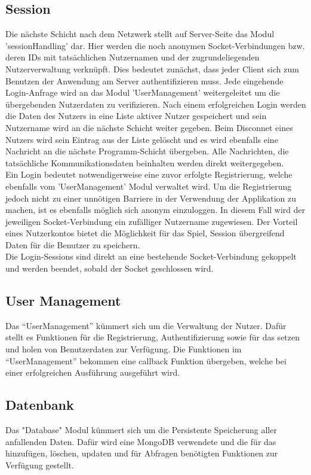 \documentclass[a4paper]{spie}  %
\begin{document}
\subsection{Session}
Die nächste Schicht nach dem Netzwerk stellt auf Server-Seite das Modul 'sessionHandling' dar. Hier werden die noch anonymen Socket-Verbindungen bzw. deren IDs mit tatsächlichen Nutzernamen und der zugrundeliegenden Nutzerverwaltung verknüpft. Dies bedeutet zunächst, dass jeder Client sich zum Benutzen der Anwendung am Server authentifizieren muss. Jede eingehende Login-Anfrage wird an das Modul 'UserManagement' weitergeleitet um die übergebenden Nutzerdaten zu verifizieren. Nach einem erfolgreichen Login werden die Daten des Nutzers in eine Liste aktiver Nutzer gespeichert und sein Nutzername wird an die nächste Schicht weiter gegeben. Beim Disconnet eines Nutzers wird sein Eintrag aus der Liste gelöscht und es wird ebenfalls eine Nachricht an die nächste Programm-Schicht übergeben. Alle Nachrichten, die tatsächliche Kommunikationsdaten beinhalten werden direkt weitergegeben.\\
Ein Login bedeutet notwendigerweise eine zuvor erfolgte Registrierung, welche ebenfalls vom 'UserManagement' Modul verwaltet wird. Um die Registrierung jedoch nicht zu einer unnötigen Barriere in der Verwendung der Applikation zu machen, ist es ebenfalls möglich sich anonym einzuloggen. In diesem Fall wird der jeweiligen Socket-Verbindung ein zufälliger Nutzername zugewiesen. Der Vorteil eines Nutzerkontos bietet die Möglichkeit für das Spiel, Session übergreifend Daten für die Benutzer zu speichern.\\
Die Login-Sessions sind direkt an eine bestehende Socket-Verbindung gekoppelt und werden beendet, sobald der Socket geschlossen wird.
\subsection{User Management}
Das \enquote{UserManagement} kümmert sich um die Verwaltung der Nutzer. Dafür stellt es Funktionen für die Registrierung, Authentifizierung sowie für das setzen und holen von Benutzerdaten zur Verfügung. Die Funktionen im \enquote{UserManagement} bekommen eine callback Funktion übergeben, welche bei einer erfolgreichen Ausführung ausgeführt wird.

\subsection{Datenbank}
Das "Database" Modul kümmert sich um die Persistente Speicherung aller anfallenden Daten. Dafür wird eine MongoDB verwendete und die für das hinzufügen, löschen, updaten und für Abfragen benötigten Funktionen zur Verfügung gestellt.
\end{document}
